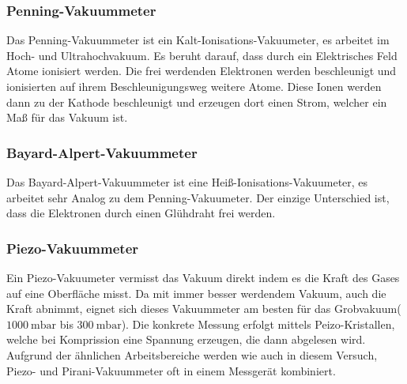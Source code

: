 		\subsubsection{Penning-Vakuummeter}

			Das Penning-Vakuummeter ist ein Kalt-Ionisations-Vakuumeter, es arbeitet im Hoch- und Ultrahochvakuum. 
			Es beruht darauf, dass durch ein Elektrisches Feld Atome ionisiert werden.
			Die frei werdenden Elektronen werden beschleunigt und ionisierten auf ihrem Beschleunigungsweg weitere Atome.
			Diese Ionen werden dann zu der Kathode beschleunigt und erzeugen dort einen Strom, welcher ein Maß für das Vakuum ist.

		\subsubsection{Bayard-Alpert-Vakuummeter}

			Das Bayard-Alpert-Vakuummeter ist eine Heiß-Ionisations-Vakuumeter, es arbeitet sehr Analog zu dem Penning-Vakuumeter.
			Der einzige Unterschied ist, dass die Elektronen durch einen Glühdraht frei werden.
		
		\subsubsection{Piezo-Vakuummeter}
			
			Ein Piezo-Vakuumeter vermisst das Vakuum direkt indem es die Kraft des Gases auf eine Oberfläche misst. 
			Da mit immer besser werdendem Vakuum, auch die Kraft abnimmt, eignet sich dieses Vakuummeter am besten für das Grobvakuum($\SI{1000}{\milli\bar}$ bis $\SI{300}{\milli\bar}$).
			Die konkrete Messung erfolgt mittels Peizo-Kristallen, welche bei Komprission eine Spannung erzeugen, die dann abgelesen wird.
			Aufgrund der ähnlichen Arbeitsbereiche werden wie auch in diesem Versuch, Piezo- und Pirani-Vakuummeter oft in einem Messgerät kombiniert.
